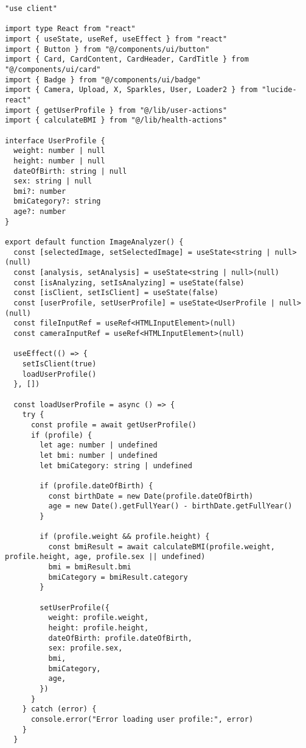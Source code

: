\documentclass[12pt,a4paper]{article}
\begin{document}
\begin{lstlisting}[caption=components/meals/image-analyzer.tsx - Estructura principal]
"use client"

import type React from "react"
import { useState, useRef, useEffect } from "react"
import { Button } from "@/components/ui/button"
import { Card, CardContent, CardHeader, CardTitle } from "@/components/ui/card"
import { Badge } from "@/components/ui/badge"
import { Camera, Upload, X, Sparkles, User, Loader2 } from "lucide-react"
import { getUserProfile } from "@/lib/user-actions"
import { calculateBMI } from "@/lib/health-actions"

interface UserProfile {
  weight: number | null
  height: number | null
  dateOfBirth: string | null
  sex: string | null
  bmi?: number
  bmiCategory?: string
  age?: number
}

export default function ImageAnalyzer() {
  const [selectedImage, setSelectedImage] = useState<string | null>(null)
  const [analysis, setAnalysis] = useState<string | null>(null)
  const [isAnalyzing, setIsAnalyzing] = useState(false)
  const [isClient, setIsClient] = useState(false)
  const [userProfile, setUserProfile] = useState<UserProfile | null>(null)
  const fileInputRef = useRef<HTMLInputElement>(null)
  const cameraInputRef = useRef<HTMLInputElement>(null)

  useEffect(() => {
    setIsClient(true)
    loadUserProfile()
  }, [])

  const loadUserProfile = async () => {
    try {
      const profile = await getUserProfile()
      if (profile) {
        let age: number | undefined
        let bmi: number | undefined
        let bmiCategory: string | undefined

        if (profile.dateOfBirth) {
          const birthDate = new Date(profile.dateOfBirth)
          age = new Date().getFullYear() - birthDate.getFullYear()
        }

        if (profile.weight && profile.height) {
          const bmiResult = await calculateBMI(profile.weight, profile.height, age, profile.sex || undefined)
          bmi = bmiResult.bmi
          bmiCategory = bmiResult.category
        }

        setUserProfile({
          weight: profile.weight,
          height: profile.height,
          dateOfBirth: profile.dateOfBirth,
          sex: profile.sex,
          bmi,
          bmiCategory,
          age,
        })
      }
    } catch (error) {
      console.error("Error loading user profile:", error)
    }
  }


\end{lstlisting}
\end{document}
